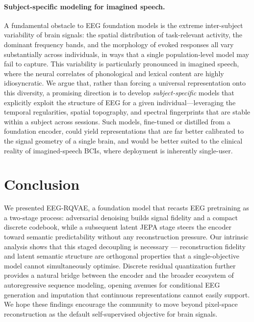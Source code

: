 \documentclass{article}
\begin{document}
\paragraph{Subject-specific modeling for imagined speech.}
A fundamental obstacle to EEG foundation models is the extreme inter-subject variability of brain signals: the spatial distribution of task-relevant activity, the dominant frequency bands, and the morphology of evoked responses all vary substantially across individuals, in ways that a single population-level model may fail to capture.
This variability is particularly pronounced in imagined speech, where the neural correlates of phonological and lexical content are highly idiosyncratic.
We argue that, rather than forcing a universal representation onto this diversity, a promising direction is to develop \emph{subject-specific} models that explicitly exploit the structure of EEG for a given individual---leveraging the temporal regularities, spatial topography, and spectral fingerprints that are stable within a subject across sessions.
Such models, fine-tuned or distilled from a foundation encoder, could yield representations that are far better calibrated to the signal geometry of a single brain, and would be better suited to the clinical reality of imagined-speech BCIs, where deployment is inherently single-user.

\section{Conclusion}

We presented EEG-RQVAE, a foundation model that recasts EEG pretraining as a two-stage process: adversarial denoising builds signal fidelity and a compact discrete codebook, while a subsequent latent JEPA stage steers the encoder toward semantic predictability without any reconstruction pressure.
Our intrinsic analysis shows that this staged decoupling is necessary --- reconstruction fidelity and latent semantic structure are orthogonal properties that a single-objective model cannot simultaneously optimise.
Discrete residual quantization further provides a natural bridge between the encoder and the broader ecosystem of autoregressive sequence modeling, opening avenues for conditional EEG generation and imputation that continuous representations cannot easily support.
We hope these findings encourage the community to move beyond pixel-space reconstruction as the default self-supervised objective for brain signals.

\newpage
\nocite{*}


\end{document}
